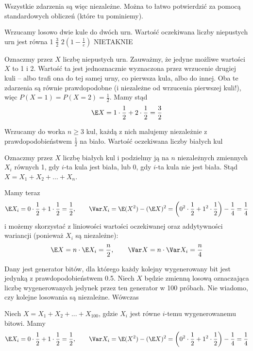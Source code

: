\begin{solutions}
    Wszystkie zdarzenia są więc niezależne. Można to łatwo potwierdzić za pomocą standardowych obliczeń (które tu pominiemy).

    \sol Wrzucamy losowo dwie kule do dwóch urn. Wartość oczekiwana liczby niepustych urn jest równa
    \answerss
    {1}
    {$\frac{3}{2}$}
    {$2(1 - \frac{1}{e})$}
    {NIE}{TAK}{NIE}

    Oznaczmy przez $X$ liczbę niepustych urn. Zauważmy, że jedyne możliwe wartości $X$ to 1 i 2. Wartość ta jest jednoznacznie wyznaczona przez wrzucenie drugiej kuli -- albo trafi ona do tej samej urny, co pierwsza kula, albo do innej. Oba te zdarzenia są równie prawdopodobne (i niezależne od wrzucenia pierwszej kuli!), więc $P(X = 1) = P(X = 2) = \frac{1}{2}$. Mamy stąd
    $$\E X = 1 \cdot \frac{1}{2} + 2 \cdot \frac{1}{2} = \frac{3}{2}$$
    
    \sol Wrzucamy do worka $n \geq 3$ kul, każdą z nich malujemy niezależnie z prawdopodobieństwem $\frac{1}{2}$ na biało. Wartość oczekiwana liczby białych kul

    Oznaczmy przez $X$ liczbę białych kul i podzielmy ją na $n$ niezależnych zmiennych $X_i$ równych 1, gdy $i$-ta kula jest biała, lub 0, gdy $i$-ta kula nie jest biała. Stąd $X = X_1 + X_2 + ... + X_n$.

    Mamy teraz
    $$\E X_i = 0 \cdot \frac{1}{2} + 1 \cdot \frac{1}{2} = \frac{1}{2}, \qquad \Var X_i = \E (X^2) - (\E X)^2 = \left(0^2 \cdot \frac{1}{2} + 1^2 \cdot \frac{1}{2}\right) - \frac{1}{4} = \frac{1}{4}$$
    i możemy skorzystać z liniowości wartości oczekiwanej oraz addytywności wariancji (ponieważ $X_i$ są niezależne):
    $$\E X = n \cdot \E X_i = \frac{n}{2}, \qquad \Var X = n \cdot \Var X_i = \frac{n}{4}$$

    \sol Dany jest generator bitów, dla którego każdy kolejny wygenerowany bit jest jedynką z prawdopodobieństwem 0.5. Niech $X$ będzie zmienną losową oznaczająca liczbę wygenerowanych jedynek przez ten generator w 100 próbach. Nie wiadomo, czy kolejne losowania są niezależne. Wówczas

    Niech $X = X_1 + X_2 + ... + X_{100}$, gdzie $X_i$ jest równe $i$-temu wygenerowanemu bitowi. Mamy
    $$\E X_i = 0 \cdot \frac{1}{2} + 1 \cdot \frac{1}{2} = \frac{1}{2}, \qquad \Var X_i = \E (X^2) - (\E X)^2 = \left(0^2 \cdot \frac{1}{2} + 1^2 \cdot \frac{1}{2}\right) - \frac{1}{4} = \frac{1}{4}$$


\end{solutions}
